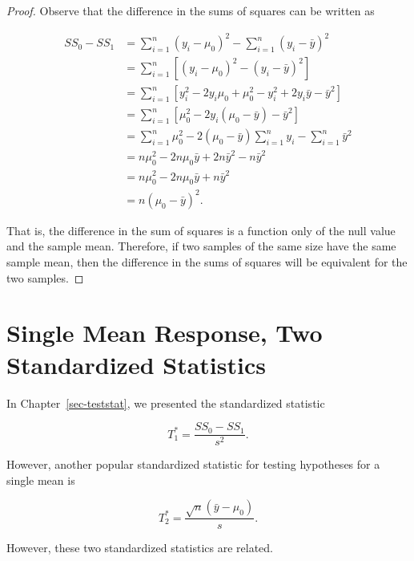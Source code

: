 \documentclass[
  letterpaper,
  DIV=11,
  numbers=noendperiod]{scrreprt}
\theoremstyle{plain}
\theoremstyle{definition}
\theoremstyle{definition}
\theoremstyle{remark}
\begin{document}
\begin{proof}

Observe that the difference in the sums of squares can be written as

\[
\begin{aligned}
  SS_0 - SS_1 
    &= \sum_{i=1}^{n} \left(y_i - \mu_0\right)^2 - \sum_{i=1}^{n} \left(y_i - \bar{y}\right)^2 \\
    &= \sum_{i=1}^{n} \left[\left(y_i - \mu_0\right)^2 - \left(y_i - \bar{y}\right)^2\right] \\
    &= \sum_{i=1}^{n} \left[y_i^2 - 2y_i \mu_0 + \mu_0^2 - y_i^2 + 2y_i \bar{y} - \bar{y}^2\right] \\
    &= \sum_{i=1}^{n} \left[\mu_0^2 - 2y_i \left(\mu_0 - \bar{y}\right) - \bar{y}^2\right] \\
    &= \sum_{i=1}^{n} \mu_0^2 - 2\left(\mu_0 - \bar{y}\right)\sum_{i=1}^{n} y_i - \sum_{i=1}^{n} \bar{y}^2 \\
    &= n\mu_0^2 - 2n\mu_0 \bar{y} + 2n\bar{y}^2 - n\bar{y}^2 \\
    &= n\mu_0^2 - 2n\mu_0 \bar{y} + n\bar{y}^2 \\
    &= n \left(\mu_0 - \bar{y}\right)^2.
\end{aligned}
\]

That is, the difference in the sum of squares is a function only of the
null value and the sample mean. Therefore, if two samples of the same
size have the same sample mean, then the difference in the sums of
squares will be equivalent for the two samples.

\end{proof}

\hypertarget{single-mean-response-two-standardized-statistics}{%
\section{Single Mean Response, Two Standardized
Statistics}\label{single-mean-response-two-standardized-statistics}}

In Chapter~\ref{sec-teststat}, we presented the standardized statistic

\[T_1^* = \frac{SS_0 - SS_1}{s^2}.\]

However, another popular standardized statistic for testing hypotheses
for a single mean is

\[T_2^* = \frac{\sqrt{n} \left(\bar{y} - \mu_0\right)}{s}.\]

However, these two standardized statistics are related.
\end{document}
